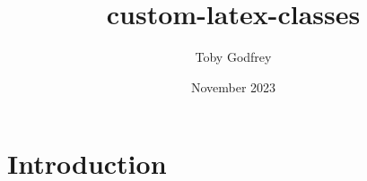 \documentclass{article}
\title{custom-latex-classes}
\author{Toby Godfrey}
\date{November 2023}
\begin{document}
\maketitle

\section{Introduction}
\end{document}
